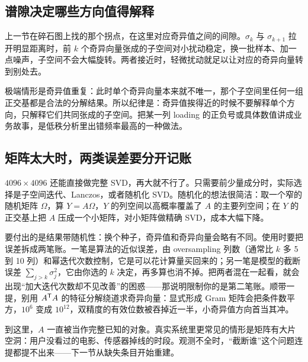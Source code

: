 \subsection{谱隙决定哪些方向值得解释}

上一节在碎石图上找的那个拐点，在这里对应奇异值之间的间隙。\(\sigma_k\) 与 \(\sigma_{k+1}\) 拉开明显距离时，前 \(k\) 个奇异向量张成的子空间对小扰动稳定，换一批样本、加一点噪声，子空间不会大幅旋转。两者接近时，轻微扰动就足以让对应的奇异向量转到别处去。

极端情形是奇异值重复：此时单个奇异向量本来就不唯一，那个子空间里任何一组正交基都是合法的分解结果。所以纪律是：奇异值挨得近的时候不要解释单个方向，只解释它们共同张成的子空间。把某一列 loading 的正负号或具体数值讲成业务故事，是低秩分析里出错频率最高的一种做法。

\subsection{矩阵太大时，两类误差要分开记账}

\(4096\times 4096\) 还能直接做完整 SVD，再大就不行了。只需要前少量成分时，实际选择是子空间迭代、Lanczos，或者随机化 SVD。随机化的想法很简洁：取一个窄的随机矩阵 \(\Omega\)，算 \(Y=A\Omega\)，\(Y\) 的列空间以高概率覆盖了 \(A\) 的主要列空间；在 \(Y\) 的正交基上把 \(A\) 压成一个小矩阵，对小矩阵做精确 SVD，成本大幅下降。

要付出的是结果带随机性：换个种子，奇异值和奇异向量会略有不同。使用时要把误差拆成两笔账。一笔是算法的近似误差，由 oversampling 列数（通常比 \(k\) 多 5 到 10 列）和幂迭代次数控制，它是可以花计算量买回来的；另一笔是模型的截断误差 \(\sum_{j>k}\sigma_j^2\)，它由你选的 \(k\) 决定，再多算也消不掉。把两者混在一起看，就会出现``加大迭代次数却不见改善''的困惑——那说明限制你的是第二笔账。顺带一提，别用 \(A^{\mathsf{T}}A\) 的特征分解绕道求奇异向量：显式形成 Gram 矩阵会把条件数平方，\(10^6\) 变成 \(10^{12}\)，双精度的有效位数被吞掉近一半，小奇异值方向首当其冲。

到这里，\(A\) 一直被当作完整已知的对象。真实系统里更常见的情形是矩阵有大片空洞：用户没看过的电影、传感器掉线的时段。观测不全时，``截断谁''这个问题连提都提不出来——下一节从缺失条目开始重建。
